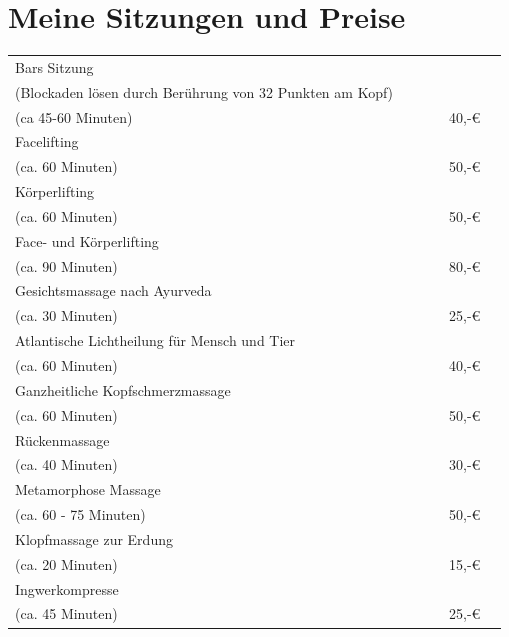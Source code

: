\documentclass[10pt,foldmark,notumble]{leaflet}
\begin{document}
\section{Meine Sitzungen und Preise}

\begin{tabular}{p{55mm}clllr}\hline\hline %
Bars Sitzung              & & & &  \\
(Blockaden lösen durch Berührung von 32 Punkten am Kopf)  & & & &    \\
(ca 45-60 Minuten) & & & &  40,-€  \\
\hline
Facelifting  & & & &  \\
(ca. 60 Minuten) & & & &  50,-€\\
\hline
Körperlifting   & & & & \\
(ca. 60 Minuten) & & & &  50,-€\\
\hline
Face- und Körperlifting   & & & &  \\
(ca. 90 Minuten) & & & &  80,-€\\
 \hline
Gesichtsmassage nach Ayurveda & & & &  \\
(ca. 30 Minuten) & & & &  25,-€ \\
\hline 
Atlantische Lichtheilung für Mensch und Tier  & & & &  \\
(ca. 60 Minuten) & & & &  40,-€ \\
\hline
Ganzheitliche Kopfschmerzmassage & & & &   \\
(ca. 60 Minuten) & & & &  50,-€ \\
\hline
Rückenmassage & & & &  \\
(ca. 40 Minuten) & & & &  30,-€ \\
\hline
Metamorphose Massage  & & & &   \\
(ca. 60 - 75 Minuten) & & & &  50,-€ \\
\hline
Klopfmassage zur Erdung  & & & &  \\
(ca. 20 Minuten) & & & &  15,-€ \\
\hline
Ingwerkompresse  & & & &   \\
(ca. 45 Minuten) & & & &  25,-€ \\
\hline
\end{tabular}
\end{document}
